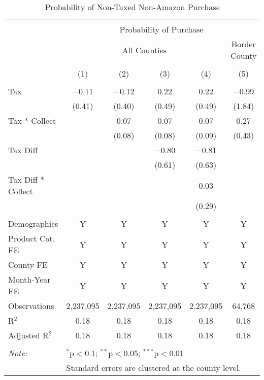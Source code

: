 
\begin{table}[!htbp] \centering 
  \caption{Probability of Non-Taxed Non-Amazon Purchase} 
  \label{tab:nontaxed_nonamazonProb} 
\begin{tabular}{@{\extracolsep{5pt}}lccccc} 
\\[-1.8ex]\hline 
\hline \\[-1.8ex] 
 & \multicolumn{5}{c}{Probability of Purchase} \\ 
\cline{2-6} 
 & \multicolumn{4}{c}{All Counties} & Border County \\ 
\\[-1.8ex] & (1) & (2) & (3) & (4) & (5)\\ 
\hline \\[-1.8ex] 
 Tax & $-$0.11 & $-$0.12 & 0.22 & 0.22 & $-$0.99 \\ 
  & (0.41) & (0.40) & (0.49) & (0.49) & (1.84) \\ 
  Tax * Collect &  & 0.07 & 0.07 & 0.07 & 0.27 \\ 
  &  & (0.08) & (0.08) & (0.09) & (0.43) \\ 
  Tax Diff &  &  & $-$0.80 & $-$0.81 &  \\ 
  &  &  & (0.61) & (0.63) &  \\ 
  Tax Diff * Collect &  &  &  & 0.03 &  \\ 
  &  &  &  & (0.29) &  \\ 
 \hline \\[-1.8ex] 
Demographics & Y & Y & Y & Y & Y \\ 
Product Cat. FE & Y & Y & Y & Y & Y \\ 
County FE & Y & Y & Y & Y & Y \\ 
Month-Year FE & Y & Y & Y & Y & Y \\ 
Observations & 2,237,095 & 2,237,095 & 2,237,095 & 2,237,095 & 64,768 \\ 
R$^{2}$ & 0.18 & 0.18 & 0.18 & 0.18 & 0.18 \\ 
Adjusted R$^{2}$ & 0.18 & 0.18 & 0.18 & 0.18 & 0.18 \\ 
\hline 
\hline \\[-1.8ex] 
\textit{Note:}  & \multicolumn{5}{l}{$^{*}$p$<$0.1; $^{**}$p$<$0.05; $^{***}$p$<$0.01} \\ 
 & \multicolumn{5}{l}{Standard errors are clustered at the county level.} \\ 
\end{tabular} 
\end{table} 
